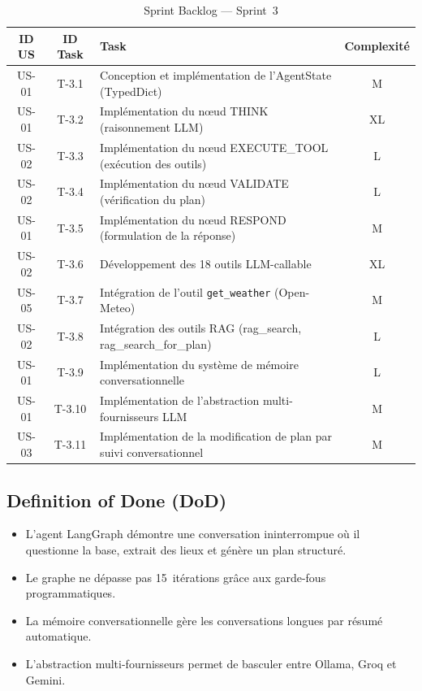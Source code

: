 \begin{table}[H]
    \centering
    \caption{Sprint Backlog --- Sprint~3}
    \label{tab:sprint3_backlog}
    \small
    \begin{tabular}{c c p{7cm} c}
        \toprule
        \textbf{ID US} & \textbf{ID Task} & \textbf{Task} & \textbf{Complexité} \\
        \midrule
        US-01 & T-3.1 & Conception et implémentation de l'AgentState (TypedDict) & M \\[3pt]
        US-01 & T-3.2 & Implémentation du nœud THINK (raisonnement LLM) & XL \\[3pt]
        US-02 & T-3.3 & Implémentation du nœud EXECUTE\_TOOL (exécution des outils) & L \\[3pt]
        US-02 & T-3.4 & Implémentation du nœud VALIDATE (vérification du plan) & L \\[3pt]
        US-01 & T-3.5 & Implémentation du nœud RESPOND (formulation de la réponse) & M \\[3pt]
        US-02 & T-3.6 & Développement des 18 outils LLM-callable & XL \\[3pt]
        US-05 & T-3.7 & Intégration de l'outil \texttt{get\_weather} (Open-Meteo) & M \\[3pt]
        US-02 & T-3.8 & Intégration des outils RAG (rag\_search, rag\_search\_for\_plan) & L \\[3pt]
        US-01 & T-3.9 & Implémentation du système de mémoire conversationnelle & L \\[3pt]
        US-01 & T-3.10 & Implémentation de l'abstraction multi-fournisseurs LLM & M \\[3pt]
        US-03 & T-3.11 & Implémentation de la modification de plan par suivi conversationnel & M \\
        \bottomrule
    \end{tabular}
\end{table}

\subsection{Definition of Done (DoD)}

\begin{itemize}
    \item L'agent LangGraph démontre une conversation ininterrompue où il questionne la base,
    extrait des lieux et génère un plan structuré.
    \item Le graphe ne dépasse pas 15~itérations grâce aux garde-fous programmatiques.
    \item La mémoire conversationnelle gère les conversations longues par résumé automatique.
    \item L'abstraction multi-fournisseurs permet de basculer entre Ollama, Groq et Gemini.
\end{itemize}


